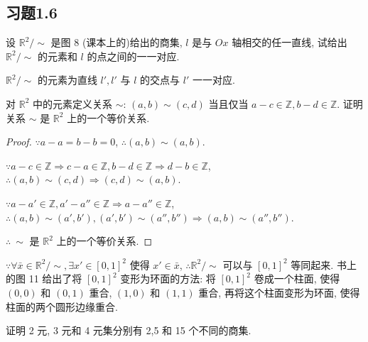 \documentclass[color=black,device=normal,lang=cn,mode=geye]{elegantnote}
\begin{document}
\subsection{习题1.6}
\begin{exercise}%
    设 $\mathbb{R}^2/\sim$ 是图 8 (课本上的)给出的商集, $l$ 是与 $Ox$ 轴相交的任一直线, 试给出 $\mathbb{R}^2/\sim$ 的元素和 $l$ 的点之间的一一对应.
\end{exercise}
\begin{solution}
    $\mathbb{R}^2/\sim$ 的元素为直线 $l',l'$ 与 $l$ 的交点与 $l'$ 一一对应.
\end{solution}
\begin{exercise}%
    对 $\mathbb{R}^2$ 中的元素定义关系 $\sim$: $(a,b)\sim(c,d)$ 当且仅当 $a-c\in\mathbb{Z},b-d\in\mathbb{Z}$. 证明关系 $\sim$ 是 $\mathbb{R}^2$ 上的一个等价关系.
\end{exercise}
\begin{proof}
    $\because a-a=b-b=0$, $\therefore(a,b)\sim(a,b)$.

    $\because a-c\in\mathbb{Z}\Rightarrow c-a\in\mathbb{Z},b-d\in\mathbb{Z}\Rightarrow d-b\in\mathbb{Z}$, $\therefore(a,b)\sim(c,d)\Rightarrow(c,d)\sim(a,b)$.

    $\because a-a'\in\mathbb{Z},a'-a''\in\mathbb{Z}\Rightarrow a-a''\in\mathbb{Z}$, $\therefore(a,b)\sim(a',b'),(a',b')\sim(a'',b'')\Rightarrow(a,b)\sim(a'',b'')$.

    $\therefore\ \sim$ 是 $\mathbb{R}^2$ 上的一个等价关系.
\end{proof}
\begin{note}
    $\because\forall\bar{x}\in\mathbb{R}^2/\sim,\exists x'\in[0,1]^2$ 使得 $x'\in\bar{x}$, $\therefore\mathbb{R}^2/\sim$ 可以与 $[0,1]^2$ 等同起来. 书上的图 11 给出了将 $[0,1]^2$ 变形为环面的方法: 将 $[0,1]^2$ 卷成一个柱面, 使得 $(0,0)$ 和 $(0,1)$ 重合, $(1,0)$ 和 $(1,1)$ 重合, 再将这个柱面变形为环面, 使得柱面的两个圆形边缘重合.
\end{note}
\begin{exercise}%
    证明 2 元, 3 元和 4 元集分别有 2,5 和 15 个不同的商集.
\end{exercise}
\end{document}
